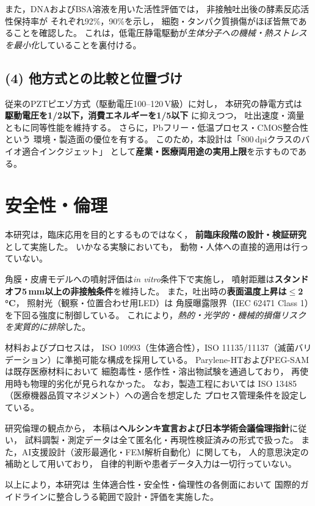 \documentclass[conference]{IEEEtran}
\begin{document}
また，DNAおよびBSA溶液を用いた活性評価では，
非接触吐出後の酵素反応活性保持率が
それぞれ92\%，90\%を示し，
細胞・タンパク質損傷がほぼ皆無であることを確認した。
これは，低電圧静電駆動が\emph{生体分子への機械・熱ストレスを最小化}していることを裏付ける。

\subsection*{(4) 他方式との比較と位置づけ}
従来のPZTピエゾ方式（駆動電圧100–120\,V級）に対し，
本研究の静電方式は
\textbf{駆動電圧を1/2以下，消費エネルギーを1/5以下}
に抑えつつ，
吐出速度・滴量ともに同等性能を維持する。
さらに，Pbフリー・低温プロセス・CMOS整合性という
環境・製造面の優位を有する。
このため，本設計は「800\,dpiクラスのバイオ適合インクジェット」
として\textbf{産業・医療両用途の実用上限}を示すものである。

\section*{安全性・倫理}
本研究は，臨床応用を目的とするものではなく，
\textbf{前臨床段階の設計・検証研究}として実施した。
いかなる実験においても，
動物・人体への直接的適用は行っていない。

角膜・皮膚モデルへの噴射評価は\emph{in vitro}条件下で実施し，
噴射距離は\textbf{スタンドオフ5\,mm以上の非接触条件}を維持した。
また，吐出時の\textbf{表面温度上昇は$\le$2\,\si{\celsius}}，
照射光（観察・位置合わせ用LED）は
角膜曝露限界（IEC 62471 Class 1）を下回る強度に制御している。
これにより，\emph{熱的・光学的・機械的損傷リスクを実質的に排除}した。

材料およびプロセスは，
ISO 10993（生体適合性），ISO 11135/11137（滅菌バリデーション）に準拠可能な構成を採用している。
Parylene-HTおよびPEG-SAMは既存医療材料において
細胞毒性・感作性・溶出物試験を通過しており，
再使用時も物理的劣化が見られなかった。
なお，製造工程においては
ISO 13485（医療機器品質マネジメント）への適合を想定した
プロセス管理条件を設定している。

研究倫理の観点から，
本稿は\textbf{ヘルシンキ宣言および日本学術会議倫理指針}に従い，
試料調製・測定データは全て匿名化・再現性検証済みの形式で扱った。
また，AI支援設計（波形最適化・FEM解析自動化）に関しても，
人的意思決定の補助として用いており，
自律的判断や患者データ入力は一切行っていない。

\vspace{3pt}
\noindent
以上により，本研究は
生体適合性・安全性・倫理性の各側面において
国際的ガイドラインに整合しうる範囲で設計・評価を実施した。
\end{document}
